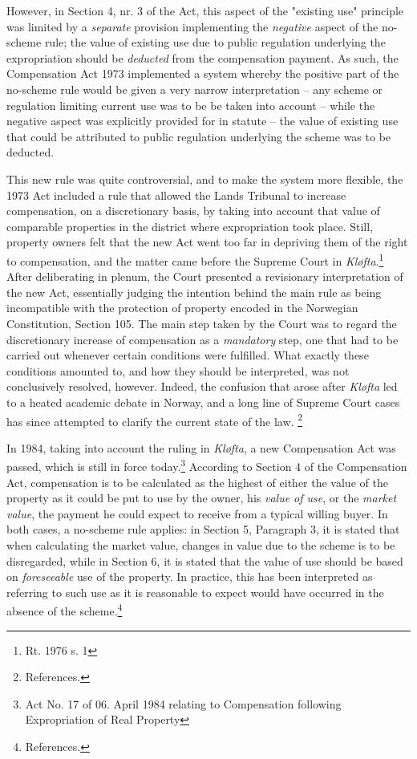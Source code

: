 However, in Section 4, nr. 3 of the Act, this aspect of the "existing use" principle was limited by a \emph{separate} provision implementing the \emph{negative} aspect of the no-scheme rule; the value of existing use due to public regulation underlying the expropriation should be \emph{deducted} from the compensation payment. As such, the Compensation Act 1973 implemented a system whereby the positive part of the no-scheme rule would be given a very narrow interpretation -- any scheme or regulation limiting current use was to be be taken into account -- while the negative aspect was explicitly provided for in statute -- the value of existing use that could be attributed to public regulation underlying the scheme was to be deducted.

This new rule was quite controversial, and to make the system more flexible, the 1973 Act included a rule that allowed the Lands Tribunal to increase compensation, on a discretionary basis, by taking into account that value of comparable properties in the district where expropriation took place. Still, property owners felt that the new Act went too far in depriving them of the right to compensation, and the matter came before the Supreme Court in \emph{Kløfta}.\footnote{Rt. 1976 s. 1} After deliberating in plenum, the Court presented a revisionary interpretation of the new Act, essentially judging the intention behind the main rule as being incompatible with the protection of property encoded in the Norwegian Constitution, Section 105. The main step taken by the Court was to regard the discretionary increase of compensation as a \emph{mandatory} step, one that had to be carried out whenever certain conditions were fulfilled. What exactly these conditions amounted to, and how they should be interpreted, was not conclusively resolved, however. Indeed, the confusion that arose after \emph{Kløfta} led to a heated academic debate in Norway, and a long line of Supreme Court cases has since attempted to clarify the current state of the law. \footnote{References.}

In 1984, taking into account the ruling in \emph{Kløfta}, a new Compensation Act was passed, which is still in force today.\footnote{Act No. 17 of 06. April 1984 relating to Compensation following Expropriation of Real Property} According to Section 4 of the Compensation Act, compensation is to be calculated as the highest of either the value of the property as it could be put to use by the owner, his \emph{value of use}, or the \emph{market value}, the payment he could expect to receive from a typical willing buyer. In both cases, a no-scheme rule applies: in Section 5, Paragraph 3, it is stated that when calculating the market value, changes in value due to the scheme is to be disregarded, while in Section 6, it is stated that the value of use should be based on \emph{foreseeable} use of the property. In practice, this has been interpreted as referring to such use as it is reasonable to expect would have occurred in the absence of the scheme.\footnote{References.} 

